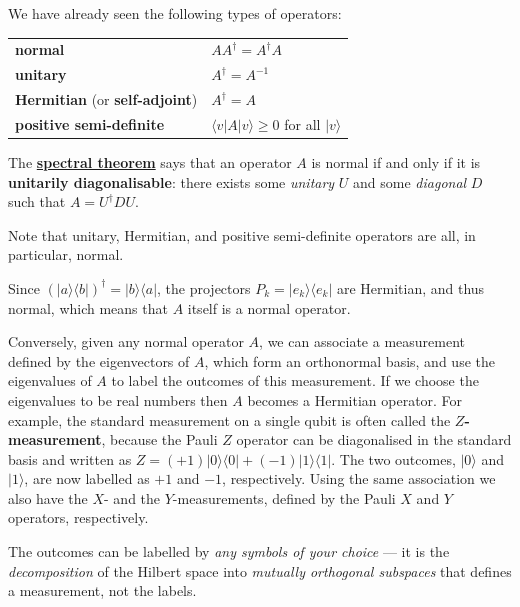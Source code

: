 \documentclass[fleqn,a4paper]{article}
\newenvironment{idea}{\everypar{\setlength{\parindent}{1.5em}}}{}
\theoremstyle{definition}
\theoremstyle{definition}
\theoremstyle{definition}
\theoremstyle{definition}
\theoremstyle{remark}
\begin{document}
\begin{idea}
We have already seen the following types of operators:

\begin{longtable}[]{@{}
  >{\raggedright\arraybackslash}p{}
  >{\raggedright\arraybackslash}p{}@{}}
\toprule()
\endhead
\textbf{normal} & \(AA^\dagger = A^\dagger A\) \\
\textbf{unitary} & \(A^\dagger = A^{-1}\) \\
\textbf{Hermitian} (or \textbf{self-adjoint}) & \(A^\dagger = A\) \\
\textbf{positive semi-definite} & \(\langle v|A|v\rangle\geqslant 0\) for all \(|v\rangle\) \\
\bottomrule()
\end{longtable}

The \href{https://en.wikipedia.org/wiki/Spectral_theorem}{\textbf{spectral theorem}} says that an operator \(A\) is normal if and only if it is \textbf{unitarily diagonalisable}: there exists some \emph{unitary} \(U\) and some \emph{diagonal} \(D\) such that \(A=U^\dagger DU\).

Note that unitary, Hermitian, and positive semi-definite operators are all, in particular, normal.

\end{idea}

Since \((|a\rangle\langle b|)^\dagger=|b\rangle\langle a|\), the projectors \(P_k=|e_k\rangle\langle e_k|\) are Hermitian, and thus normal, which means that \(A\) itself is a normal operator.

Conversely, given any normal operator \(A\), we can associate a measurement defined by the eigenvectors of \(A\), which form an orthonormal basis, and use the eigenvalues of \(A\) to label the outcomes of this measurement.
If we choose the eigenvalues to be real numbers then \(A\) becomes a Hermitian operator.
For example, the standard measurement on a single qubit is often called the \textbf{\(Z\)-measurement}, because the Pauli \(Z\) operator can be diagonalised in the standard basis and written as \(Z = (+1)|0\rangle\langle 0| + (-1)|1\rangle\langle 1|\).
The two outcomes, \(|0\rangle\) and \(|1\rangle\), are now labelled as \(+1\) and \(-1\), respectively.
Using the same association we also have the \(X\)- and the \(Y\)-measurements, defined by the Pauli \(X\) and \(Y\) operators, respectively.

\begin{idea}
The outcomes can be labelled by \emph{any symbols of your choice} --- it is the \emph{decomposition} of the Hilbert space into \emph{mutually orthogonal subspaces} that defines a measurement, not the labels.

\end{idea}
\end{document}
